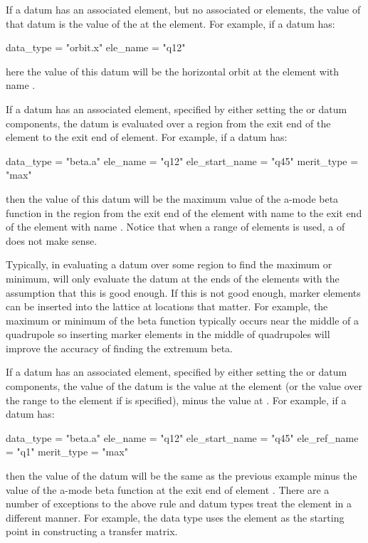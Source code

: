 If a datum has an associated  element, but no
associated  or  elements, the  value
of that datum is the value of the  at the 
element. For example, if a datum has:
\begin{example}
  data_type      = "orbit.x"
  ele_name       = "q12"
\end{example}
here the  value of this datum will be the horizontal orbit
at the element with name .

If a datum has an associated  element, specified by either
setting the  or  datum components, the
datum is evaluated over a region from the exit end of the  element
to the exit end of  element. For example, if a datum has:
\begin{example}
  data_type      = "beta.a"
  ele_name       = "q12"
  ele_start_name = "q45"
  merit_type     = "max"
\end{example}
then the  value of this datum will be the maximum value of
the a-mode beta function in the region from the exit end of the
element with name  to the exit end of the element with name
. Notice that when a range of elements is used, a
 of  does not make sense. 

Typically, in evaluating a datum over some region to find the maximum
or minimum, \tao will only evaluate the datum at the ends of the
elements with the assumption that this is good enough. If this is not
good enough, marker elements can be inserted into the lattice at
locations that matter. For example, the maximum or minimum of the beta
function typically occurs near the middle of a quadrupole so inserting
marker elements in the middle of quadrupoles will improve the accuracy
of finding the extremum beta.

If a datum has an associated  element, specified by either
setting the  or  datum components, the
 value of the datum is the value at the  element (or the value
over the range  to the  element if  is
specified), minus the  value at . For example,
if a datum has:
\begin{example}
  data_type      = "beta.a"
  ele_name       = "q12"
  ele_start_name = "q45"
  ele_ref_name   = "q1"
  merit_type     = "max"
\end{example}
then the  value of the datum will be the same as the
previous example minus the value of the a-mode beta function at the
exit end of element . There are a number of exceptions to the
above rule and datum types treat the  element in a different
manner. For example, the  data type uses the  element
as the starting point in constructing a transfer matrix.

